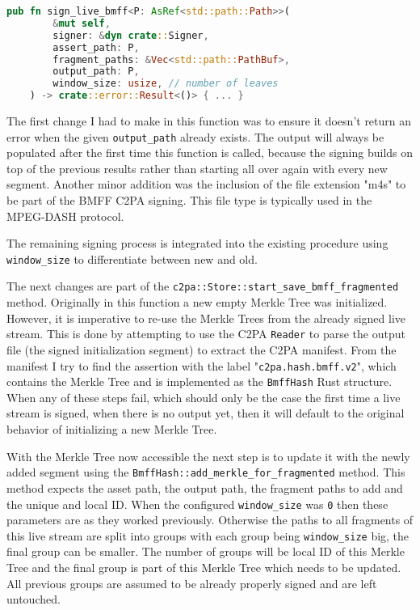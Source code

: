 \begin{minipage}{\linewidth}
\begin{lstlisting}[caption={New Live Signing Function}, label=code:live_sign, language=Rust, captionpos=b]
    pub fn sign_live_bmff<P: AsRef<std::path::Path>>(
        &mut self,
        signer: &dyn crate::Signer,
        assert_path: P,
        fragment_paths: &Vec<std::path::PathBuf>,
        output_path: P,
        window_size: usize, // number of leaves
    ) -> crate::error::Result<()> { ... }
\end{lstlisting}
\end{minipage}

The first change I had to make in this function was to ensure it doesn't return an error when the given \texttt{output\_path} already exists. The output will always be populated after the first time this function is called, because the signing builds on top of the previous results rather than starting all over again with every new segment. Another minor addition was the inclusion of the file extension "m4s" to be part of the BMFF C2PA signing. This file type is typically used in the MPEG-DASH protocol.

The remaining signing process is integrated into the existing procedure using \texttt{window\_size} to differentiate between new and old.

The next changes are part of the \texttt{c2pa::Store::start\_save\_bmff\_fragmented} method. Originally in this function a new empty Merkle Tree was initialized. However, it is imperative to re-use the Merkle Trees from the already signed live stream. This is done by attempting to use the C2PA \texttt{Reader} to parse the output file (the signed initialization segment) to extract the C2PA manifest. From the manifest I try to find the assertion with the label "\texttt{c2pa.hash.bmff.v2}", which contains the Merkle Tree and is implemented as the \texttt{BmffHash} Rust structure. When any of these steps fail, which should only be the case the first time a live stream is signed, when there is no output yet, then it will default to the original behavior of initializing a new Merkle Tree.

With the Merkle Tree now accessible the next step is to update it with the newly added segment using the \texttt{BmffHash::add\_merkle\_for\_fragmented} method. This method expects the asset path, the output path, the fragment paths to add and the unique and local ID. When the configured \texttt{window\_size} was \texttt{0} then these parameters are as they worked previously. Otherwise the paths to all fragments of this live stream are split into groups with each group being \texttt{window\_size} big, the final group can be smaller. The number of groups will be local ID of this Merkle Tree and the final group is part of this Merkle Tree which needs to be updated. All previous groups are assumed to be already properly signed and are left untouched.

